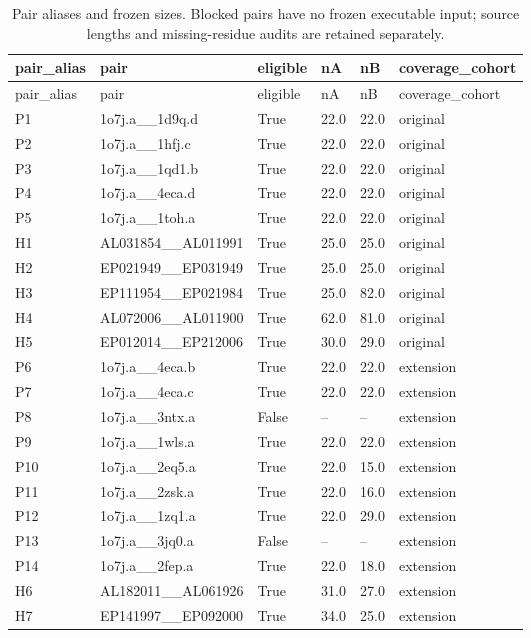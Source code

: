 \begingroup
\small
\begin{longtable}{llllll}
\caption{Pair aliases and frozen sizes. Blocked pairs have no frozen executable input; source lengths and missing-residue audits are retained separately.}\label{tab:coverage-inputs}\\
\toprule
pair\_alias & pair & eligible & nA & nB & coverage\_cohort \\
\midrule
\endfirsthead
\toprule
pair\_alias & pair & eligible & nA & nB & coverage\_cohort \\
\midrule
\endhead
P1 & 1o7j.a\_\_1d9q.d & True & 22.0 & 22.0 & original \\
P2 & 1o7j.a\_\_1hfj.c & True & 22.0 & 22.0 & original \\
P3 & 1o7j.a\_\_1qd1.b & True & 22.0 & 22.0 & original \\
P4 & 1o7j.a\_\_4eca.d & True & 22.0 & 22.0 & original \\
P5 & 1o7j.a\_\_1toh.a & True & 22.0 & 22.0 & original \\
H1 & AL031854\_\_AL011991 & True & 25.0 & 25.0 & original \\
H2 & EP021949\_\_EP031949 & True & 25.0 & 25.0 & original \\
H3 & EP111954\_\_EP021984 & True & 25.0 & 82.0 & original \\
H4 & AL072006\_\_AL011900 & True & 62.0 & 81.0 & original \\
H5 & EP012014\_\_EP212006 & True & 30.0 & 29.0 & original \\
P6 & 1o7j.a\_\_4eca.b & True & 22.0 & 22.0 & extension \\
P7 & 1o7j.a\_\_4eca.c & True & 22.0 & 22.0 & extension \\
P8 & 1o7j.a\_\_3ntx.a & False & -- & -- & extension \\
P9 & 1o7j.a\_\_1wls.a & True & 22.0 & 22.0 & extension \\
P10 & 1o7j.a\_\_2eq5.a & True & 22.0 & 15.0 & extension \\
P11 & 1o7j.a\_\_2zsk.a & True & 22.0 & 16.0 & extension \\
P12 & 1o7j.a\_\_1zq1.a & True & 22.0 & 29.0 & extension \\
P13 & 1o7j.a\_\_3jq0.a & False & -- & -- & extension \\
P14 & 1o7j.a\_\_2fep.a & True & 22.0 & 18.0 & extension \\
H6 & AL182011\_\_AL061926 & True & 31.0 & 27.0 & extension \\
H7 & EP141997\_\_EP092000 & True & 34.0 & 25.0 & extension \\

\end{longtable}
